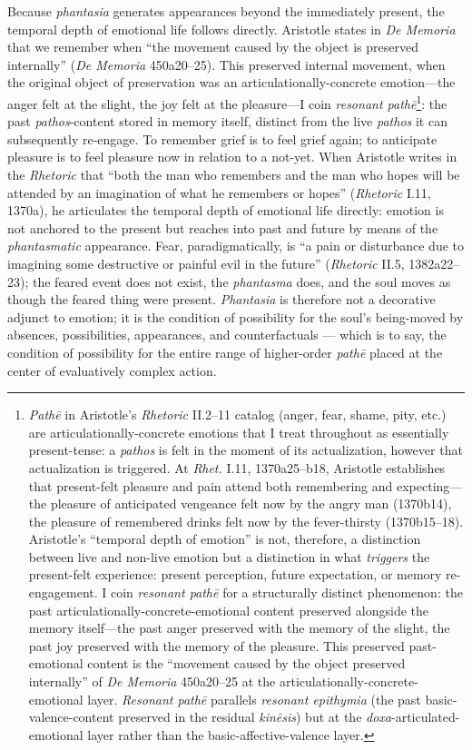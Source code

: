 \documentclass{article}
\begin{document}
Because \textit{phantasia} generates appearances beyond the immediately present, the temporal depth of emotional life follows directly. Aristotle states in \textit{De Memoria} that we remember when ``the movement caused by the object is preserved internally'' (\textit{De Memoria} 450a20--25). This preserved internal movement, when the original object of preservation was an articulationally-concrete emotion---the anger felt at the slight, the joy felt at the pleasure---I coin \textit{resonant pathē}\footnote{\textit{Pathē} in Aristotle's \textit{Rhetoric} II.2--11 catalog (anger, fear, shame, pity, etc.) are articulationally-concrete emotions that I treat throughout as essentially present-tense: a \textit{pathos} is felt in the moment of its actualization, however that actualization is triggered. At \textit{Rhet.} I.11, 1370a25--b18, Aristotle establishes that present-felt pleasure and pain attend both remembering and expecting---the pleasure of anticipated vengeance felt now by the angry man (1370b14), the pleasure of remembered drinks felt now by the fever-thirsty (1370b15--18). Aristotle's ``temporal depth of emotion'' is not, therefore, a distinction between live and non-live emotion but a distinction in what \textit{triggers} the present-felt experience: present perception, future expectation, or memory re-engagement. I coin \textit{resonant pathē} for a structurally distinct phenomenon: the past articulationally-concrete-emotional content preserved alongside the memory itself---the past anger preserved with the memory of the slight, the past joy preserved with the memory of the pleasure. This preserved past-emotional content is the ``movement caused by the object preserved internally'' of \textit{De Memoria} 450a20--25 at the articulationally-concrete-emotional layer. \textit{Resonant pathē} parallels \textit{resonant epithymia} (the past basic-valence-content preserved in the residual \textit{kinēsis}) but at the \textit{doxa}-articulated-emotional layer rather than the basic-affective-valence layer.}: the past \textit{pathos}-content stored in memory itself, distinct from the live \textit{pathos} it can subsequently re-engage. To remember grief is to feel grief again; to anticipate pleasure is to feel pleasure now in relation to a not-yet. When Aristotle writes in the \textit{Rhetoric} that ``both the man who remembers and the man who hopes will be attended by an imagination of what he remembers or hopes'' (\textit{Rhetoric} I.11, 1370a), he articulates the temporal depth of emotional life directly: emotion is not anchored to the present but reaches into past and future by means of the \textit{phantasmatic} appearance. Fear, paradigmatically, is ``a pain or disturbance due to imagining some destructive or painful evil in the future'' (\textit{Rhetoric} II.5, 1382a22--23); the feared event does not exist, the \textit{phantasma} does, and the soul moves as though the feared thing were present. \textit{Phantasia} is therefore not a decorative adjunct to emotion; it is the condition of possibility for the soul's being-moved by absences, possibilities, appearances, and counterfactuals --- which is to say, the condition of possibility for the entire range of higher-order \textit{pathē} placed at the center of evaluatively complex action.
\end{document}
